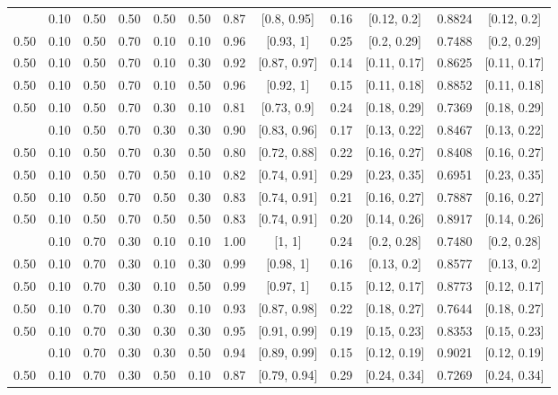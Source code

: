 \documentclass[
  11pt,
]{article}
\begin{document}
\begin{landscape}
\begin{ThreePartTable}
\begin{longtable}[t]{cccccccccccc}
\addlinespace
0.50 & 0.10 & 0.50 & 0.50 & 0.50 & 0.50 & 0.87 & {}[0.8, 0.95] & 0.16 & {}[0.12, 0.2] & 0.8824 & {}[0.12, 0.2]\\
0.50 & 0.10 & 0.50 & 0.70 & 0.10 & 0.10 & 0.96 & {}[0.93, 1] & 0.25 & {}[0.2, 0.29] & 0.7488 & {}[0.2, 0.29]\\
0.50 & 0.10 & 0.50 & 0.70 & 0.10 & 0.30 & 0.92 & {}[0.87, 0.97] & 0.14 & {}[0.11, 0.17] & 0.8625 & {}[0.11, 0.17]\\
0.50 & 0.10 & 0.50 & 0.70 & 0.10 & 0.50 & 0.96 & {}[0.92, 1] & 0.15 & {}[0.11, 0.18] & 0.8852 & {}[0.11, 0.18]\\
0.50 & 0.10 & 0.50 & 0.70 & 0.30 & 0.10 & 0.81 & {}[0.73, 0.9] & 0.24 & {}[0.18, 0.29] & 0.7369 & {}[0.18, 0.29]\\
\addlinespace
0.50 & 0.10 & 0.50 & 0.70 & 0.30 & 0.30 & 0.90 & {}[0.83, 0.96] & 0.17 & {}[0.13, 0.22] & 0.8467 & {}[0.13, 0.22]\\
0.50 & 0.10 & 0.50 & 0.70 & 0.30 & 0.50 & 0.80 & {}[0.72, 0.88] & 0.22 & {}[0.16, 0.27] & 0.8408 & {}[0.16, 0.27]\\
0.50 & 0.10 & 0.50 & 0.70 & 0.50 & 0.10 & 0.82 & {}[0.74, 0.91] & 0.29 & {}[0.23, 0.35] & 0.6951 & {}[0.23, 0.35]\\
0.50 & 0.10 & 0.50 & 0.70 & 0.50 & 0.30 & 0.83 & {}[0.74, 0.91] & 0.21 & {}[0.16, 0.27] & 0.7887 & {}[0.16, 0.27]\\
0.50 & 0.10 & 0.50 & 0.70 & 0.50 & 0.50 & 0.83 & {}[0.74, 0.91] & 0.20 & {}[0.14, 0.26] & 0.8917 & {}[0.14, 0.26]\\
\addlinespace
0.50 & 0.10 & 0.70 & 0.30 & 0.10 & 0.10 & 1.00 & {}[1, 1] & 0.24 & {}[0.2, 0.28] & 0.7480 & {}[0.2, 0.28]\\
0.50 & 0.10 & 0.70 & 0.30 & 0.10 & 0.30 & 0.99 & {}[0.98, 1] & 0.16 & {}[0.13, 0.2] & 0.8577 & {}[0.13, 0.2]\\
0.50 & 0.10 & 0.70 & 0.30 & 0.10 & 0.50 & 0.99 & {}[0.97, 1] & 0.15 & {}[0.12, 0.17] & 0.8773 & {}[0.12, 0.17]\\
0.50 & 0.10 & 0.70 & 0.30 & 0.30 & 0.10 & 0.93 & {}[0.87, 0.98] & 0.22 & {}[0.18, 0.27] & 0.7644 & {}[0.18, 0.27]\\
0.50 & 0.10 & 0.70 & 0.30 & 0.30 & 0.30 & 0.95 & {}[0.91, 0.99] & 0.19 & {}[0.15, 0.23] & 0.8353 & {}[0.15, 0.23]\\
\addlinespace
0.50 & 0.10 & 0.70 & 0.30 & 0.30 & 0.50 & 0.94 & {}[0.89, 0.99] & 0.15 & {}[0.12, 0.19] & 0.9021 & {}[0.12, 0.19]\\
0.50 & 0.10 & 0.70 & 0.30 & 0.50 & 0.10 & 0.87 & {}[0.79, 0.94] & 0.29 & {}[0.24, 0.34] & 0.7269 & {}[0.24, 0.34]\\

\end{longtable}
\end{ThreePartTable}
\end{landscape}
\end{document}
